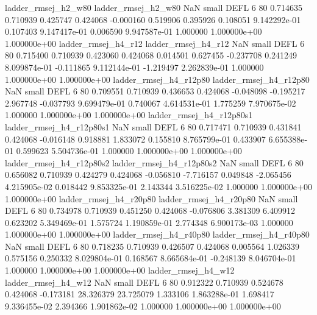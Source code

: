      ladder_rmsej_h2_w80      ladder_rmsej_h2_w80                   NaN      small     DEFL                 6 80 0.714635       0.710939 0.425747       0.424068   -0.000160      0.519906      0.395926     0.108051   9.142292e-01  0.107403 9.147417e-01     0.006590   9.947587e-01            1.000000    1.000000e+00        1.000000e+00
     ladder_rmsej_h4_r12      ladder_rmsej_h4_r12                   NaN      small     DEFL                 6 80 0.715400       0.710939 0.423060       0.424068    0.014501      0.627455     -0.237708     0.241249   8.099874e-01 -0.111865 9.112144e-01    -1.219497   2.262839e-01            1.000000    1.000000e+00        1.000000e+00
  ladder_rmsej_h4_r12p80   ladder_rmsej_h4_r12p80                   NaN      small     DEFL                 6 80 0.709551       0.710939 0.436653       0.424068   -0.048098     -0.195217      2.967748    -0.037793   9.699479e-01  0.740067 4.614531e-01     1.775259   7.970675e-02            1.000000    1.000000e+00        1.000000e+00
ladder_rmsej_h4_r12p80s1 ladder_rmsej_h4_r12p80s1                   NaN      small     DEFL                 6 80 0.717471       0.710939 0.431841       0.424068   -0.016148      0.918881      1.833072     0.155810   8.765799e-01  0.433907 6.655388e-01     0.599623   5.504736e-01            1.000000    1.000000e+00        1.000000e+00
ladder_rmsej_h4_r12p80s2 ladder_rmsej_h4_r12p80s2                   NaN      small     DEFL                 6 80 0.656082       0.710939 0.424279       0.424068   -0.056810     -7.716157      0.049848    -2.065456   4.215905e-02  0.018442 9.853325e-01     2.143344   3.516225e-02            1.000000    1.000000e+00        1.000000e+00
  ladder_rmsej_h4_r20p80   ladder_rmsej_h4_r20p80                   NaN      small     DEFL                 6 80 0.734978       0.710939 0.451250       0.424068   -0.076806      3.381309      6.409912     0.623202   5.349469e-01  1.575724 1.190859e-01     2.774348   6.900173e-03            1.000000    1.000000e+00        1.000000e+00
  ladder_rmsej_h4_r40p80   ladder_rmsej_h4_r40p80                   NaN      small     DEFL                 6 80 0.718235       0.710939 0.426507       0.424068    0.005564      1.026339      0.575156     0.250332   8.029804e-01  0.168567 8.665684e-01    -0.248139   8.046704e-01            1.000000    1.000000e+00        1.000000e+00
     ladder_rmsej_h4_w12      ladder_rmsej_h4_w12                   NaN      small     DEFL                 6 80 0.912322       0.710939 0.524678       0.424068   -0.173181     28.326379     23.725079     1.333106   1.863288e-01  1.698417 9.336455e-02     2.394366   1.901862e-02            1.000000    1.000000e+00        1.000000e+00
